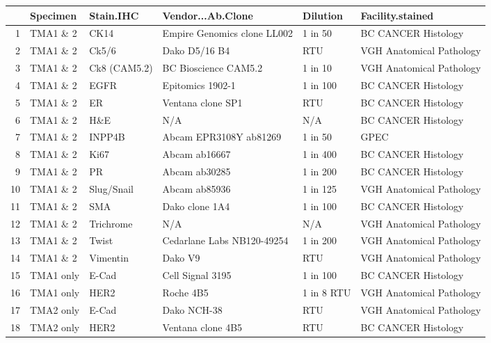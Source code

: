 \documentclass{article}
\begin{document}

\begin{table}[ht]
\centering
\begin{tabular}{rlllll}
  \hline
 & Specimen & Stain.IHC & Vendor...Ab.Clone & Dilution & Facility.stained \\ 
  \hline
1 & TMA1 \& 2 & CK14 & Empire Genomics clone LL002 & 1 in 50 & BC CANCER Histology \\ 
  2 & TMA1 \& 2 & Ck5/6 & Dako D5/16 B4 & RTU & VGH Anatomical Pathology \\ 
  3 & TMA1 \& 2 & Ck8 (CAM5.2) & BC Bioscience CAM5.2 & 1 in 10 & VGH Anatomical Pathology \\ 
  4 & TMA1 \& 2 & EGFR & Epitomics 1902-1 & 1 in 100 & BC CANCER Histology \\ 
  5 & TMA1 \& 2 & ER & Ventana  clone SP1 & RTU & BC CANCER Histology \\ 
  6 & TMA1 \& 2 & H\&E & N/A & N/A & BC CANCER Histology \\ 
  7 & TMA1 \& 2 & INPP4B & Abcam EPR3108Y ab81269 & 1 in 50 & GPEC \\ 
  8 & TMA1 \& 2 & Ki67 & Abcam ab16667 & 1 in 400 & BC CANCER Histology \\ 
  9 & TMA1 \& 2 & PR & Abcam ab30285 & 1 in 200 & BC CANCER Histology \\ 
  10 & TMA1 \& 2 & Slug/Snail & Abcam ab85936  & 1 in 125 & VGH Anatomical Pathology \\ 
  11 & TMA1 \& 2 & SMA & Dako clone 1A4 & 1 in 100 & BC CANCER Histology \\ 
  12 & TMA1 \& 2 & Trichrome & N/A & N/A & VGH Anatomical Pathology \\ 
  13 & TMA1 \& 2 & Twist & Cedarlane Labs NB120-49254  & 1 in 200 & VGH Anatomical Pathology \\ 
  14 & TMA1 \& 2 & Vimentin & Dako V9 & RTU & VGH Anatomical Pathology \\ 
  15 & TMA1 only & E-Cad & Cell Signal 3195 & 1 in 100 & BC CANCER Histology \\ 
  16 & TMA1 only & HER2 & Roche 4B5 & 1 in 8 RTU & VGH Anatomical Pathology \\ 
  17 & TMA2 only & E-Cad & Dako NCH-38 & RTU & VGH Anatomical Pathology \\ 
  18 & TMA2 only & HER2 & Ventana  clone 4B5 & RTU & BC CANCER Histology \\ 
   \hline
\end{tabular}
\end{table}
\end{document}
